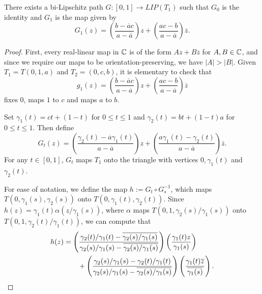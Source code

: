 \documentclass{amsart}
\begin{document}
\begin{proposition}
\label{prop:tripath}
There exists a bi-Lipschitz path $G: [0,1]\to LIP( T_1)$ such that $G_0$ is the identity and $G_1$ is the map given by
\[ G_1(z) = \left ( \frac{ b-\overline{a}c}{a-\overline{a} } \right ) z + \left ( \frac{ ac-b}{a-\overline{a} } \right ) \overline{z}.\]
\end{proposition}

\begin{proof}
First, every real-linear map in $\mathbb{C}$ is of the form $Az+B\overline{z}$ for $A,B \in \mathbb{C}$, and since we require our maps to be orientation-preserving, we have $|A| > |B|$. Given $T_1 = T(0,1,a)$ and $T_2 = (0,c,b)$, it is elementary to check that
\[ g_1(z) = \left ( \frac{ b-\overline{a}c}{a-\overline{a} } \right ) z + \left ( \frac{ ac-b}{a-\overline{a} } \right ) \overline{z}\]
fixes $0$, maps $1$ to $c$ and maps $a$ to $b$.

Set $\gamma_1(t) = ct + (1-t)$ for $0\leq t \leq 1$ and $\gamma_2(t) = bt + (1-t)a$ for $0\leq t \leq 1$. Then define 
\[ G_t(z) = \left ( \frac{ \gamma_2(t) - \overline{a} \gamma_1(t) }{a-\overline{a} } \right )z + \left ( \frac{ a\gamma_1(t) - \gamma_2(t) }{a-\overline{a} }\right ) \overline{z} .\]
For any $t\in [0,1]$, $G_t$ maps $T_1$ onto the triangle with vertices $0, \gamma_1(t)$ and $\gamma_2(t)$.

For ease of notation, we define the map $h:= G_t\circ G_s^{-1}$, which maps $T(0,\gamma_1(s),\gamma_2(s))$ onto $T(0,\gamma_1(t) , \gamma_2(t))$. Since $h(z) = \gamma_1(t) \alpha ( z/\gamma_1(s))$, where $\alpha$ maps $T(0,1,\gamma_2(s)/\gamma_1(s))$ onto $T(0,1,\gamma_2(t) / \gamma_1(t) )$, we can compute that
\begin{align}
\label{eq:p1}
h(z) &= \left ( \frac{ \gamma_2(t) / \gamma_1(t) - \overline{ \gamma_2(s) / \gamma_1(s) } }{ \gamma_2(s) / \gamma_1(s) - \overline{ \gamma_2(s) / \gamma_1(s) } } \right ) \left ( \frac{ \gamma_1(t)z}{\gamma_1(s) } \right )\\
& \qquad+ \left ( \frac{ \gamma_2(s) / \gamma_1(s) - \gamma_2(t) / \gamma_1(t)  }{ \gamma_2(s) / \gamma_1(s) - \overline{ \gamma_2(s) / \gamma_1(s) } } \right  ) \left ( \frac{ \gamma_1(t) \overline{z}}{\overline{\gamma_1(s)}} \right ) \notag.
\end{align}


\end{proof}
\end{document}
